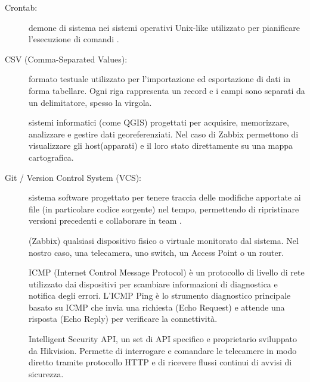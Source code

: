 \documentclass[12pt, a4paper, oneside]{report}
\begin{document}
\begin{description}
    \item[Crontab:] demone di sistema nei sistemi operativi Unix-like utilizzato per pianificare l'esecuzione di comandi \parencite{man_crontab}.
    \item[CSV (Comma-Separated Values):] formato testuale utilizzato per l'importazione ed esportazione di dati in forma tabellare. Ogni riga rappresenta un record e i campi sono separati da un delimitatore, spesso la virgola.
    \item[\hypertarget{glo:GIS}GIS (Geographic Information System):] sistemi informatici (come QGIS) progettati per acquisire, memorizzare, analizzare e gestire dati georeferenziati. Nel caso di Zabbix permettono di visualizzare gli host(apparati) e il loro stato direttamente su una mappa cartografica.
    \item[Git / Version Control System (VCS):] sistema software progettato per tenere traccia delle modifiche apportate ai file (in particolare codice sorgente) nel tempo, permettendo di ripristinare versioni precedenti e collaborare in team \parencite{git_scm}.
    \item[\hypertarget{glo:host}Host:] (Zabbix) qualsiasi dispositivo fisico o virtuale monitorato dal sistema. Nel nostro caso, una telecamera, uno switch, un Access Point o un router.
    \item[\hypertarget{glo:icmpping}ICMP Ping:] ICMP (Internet Control Message Protocol) è un protocollo di livello di rete utilizzato dai dispositivi per scambiare informazioni di diagnostica e notifica degli errori. L'ICMP Ping è lo strumento diagnostico principale basato su ICMP che invia una richiesta (Echo Request) e attende una risposta (Echo Reply) per verificare la connettività.
    \item[\hypertarget{glo:isapi}ISAPI:] Intelligent Security API, un set di API specifico e proprietario sviluppato da Hikvision. Permette di interrogare e comandare le telecamere in modo diretto tramite protocollo HTTP e di ricevere flussi continui di avvisi di sicurezza.

\end{description}
\end{document}

